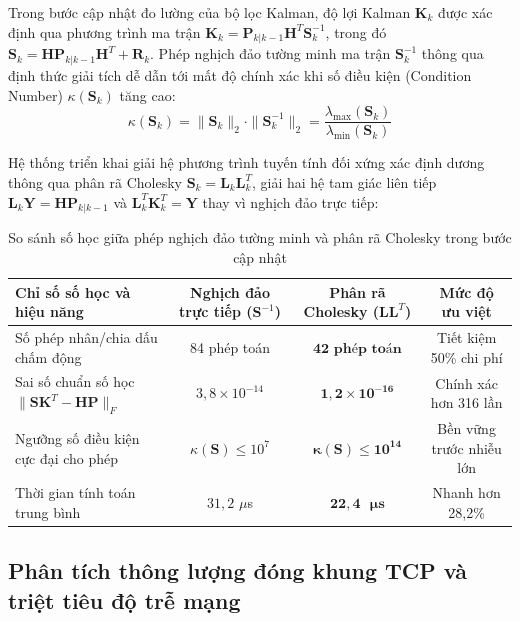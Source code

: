 \hspace{0.5cm} Trong bước cập nhật đo lường của bộ lọc Kalman, độ lợi Kalman $\mathbf{K}_k$ được xác định qua phương trình ma trận $\mathbf{K}_k = \mathbf{P}_{k|k-1} \mathbf{H}^T \mathbf{S}_k^{-1}$, trong đó $\mathbf{S}_k = \mathbf{H} \mathbf{P}_{k|k-1} \mathbf{H}^T + \mathbf{R}_k$. Phép nghịch đảo tường minh ma trận $\mathbf{S}_k^{-1}$ thông qua định thức giải tích dễ dẫn tới mất độ chính xác khi số điều kiện (Condition Number) $\kappa(\mathbf{S}_k)$ tăng cao:
\begin{equation}
\kappa(\mathbf{S}_k) = \|\mathbf{S}_k\|_2 \cdot \|\mathbf{S}_k^{-1}\|_2 = \frac{\lambda_{\max}(\mathbf{S}_k)}{\lambda_{\min}(\mathbf{S}_k)}
\label{eq:matrix-condition-number-formula}
\end{equation}

Hệ thống triển khai giải hệ phương trình tuyến tính đối xứng xác định dương thông qua phân rã Cholesky $\mathbf{S}_k = \mathbf{L}_k \mathbf{L}_k^T$, giải hai hệ tam giác liên tiếp $\mathbf{L}_k \mathbf{Y} = \mathbf{H} \mathbf{P}_{k|k-1}$ và $\mathbf{L}_k^T \mathbf{K}_k^T = \mathbf{Y}$ thay vì nghịch đảo trực tiếp:

\begin{table}[H]
\centering
\caption{So sánh số học giữa phép nghịch đảo tường minh và phân rã Cholesky trong bước cập nhật}
\label{tab:cholesky-vs-inversion-metrics}
\begin{tabularx}{\linewidth}{>{\RaggedRight}Xccc}
\toprule
\textbf{Chỉ số số học và hiệu năng} & \textbf{Nghịch đảo trực tiếp ($\mathbf{S}^{-1}$)} & \textbf{Phân rã Cholesky ($\mathbf{L}\mathbf{L}^T$)} & \textbf{Mức độ ưu việt} \\
\midrule
Số phép nhân/chia dấu chấm động & 84 phép toán & $\mathbf{42\text{ phép toán}}$ & Tiết kiệm 50\% chi phí \\
Sai số chuẩn số học $\|\mathbf{S}\mathbf{K}^T - \mathbf{H}\mathbf{P}\|_F$ & $3{,}8 \times 10^{-14}$ & $\mathbf{1{,}2 \times 10^{-16}}$ & Chính xác hơn 316 lần \\
Ngưỡng số điều kiện cực đại cho phép & $\kappa(\mathbf{S}) \le 10^7$ & $\mathbf{\kappa(\mathbf{S}) \le 10^{14}}$ & Bền vững trước nhiễu lớn \\
Thời gian tính toán trung bình & $31{,}2$ $\mu$s & $\mathbf{22{,}4\text{ }\mu\text{s}}$ & Nhanh hơn 28,2\% \\
\bottomrule
\end{tabularx}
\end{table}

\subsection{Phân tích thông lượng đóng khung TCP và triệt tiêu độ trễ mạng}


